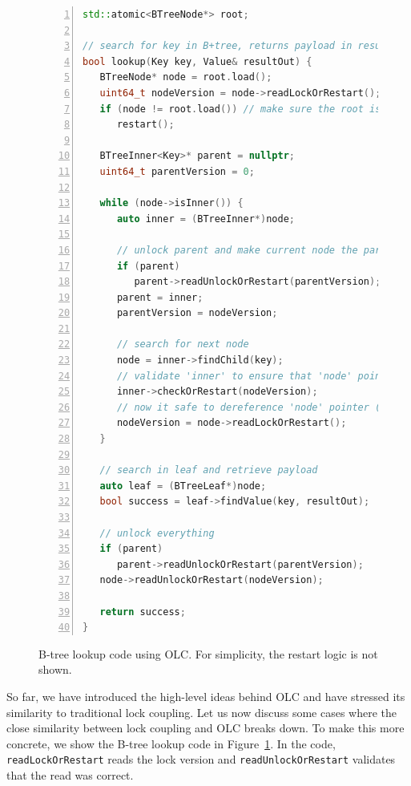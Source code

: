 \documentclass[11pt]{article}
\begin{document}
\begin{figure}
\begin{lstlisting}[basicstyle=\ttfamily,language=C++,numbers=left,numberstyle=\small]
std::atomic<BTreeNode*> root;

// search for key in B+tree, returns payload in resultOut
bool lookup(Key key, Value& resultOut) {
   BTreeNode* node = root.load();
   uint64_t nodeVersion = node->readLockOrRestart();
   if (node != root.load()) // make sure the root is still the root
      restart();

   BTreeInner<Key>* parent = nullptr;
   uint64_t parentVersion = 0;

   while (node->isInner()) {
      auto inner = (BTreeInner*)node;

      // unlock parent and make current node the parent
      if (parent)
         parent->readUnlockOrRestart(parentVersion);
      parent = inner;
      parentVersion = nodeVersion;

      // search for next node
      node = inner->findChild(key);
      // validate 'inner' to ensure that 'node' pointer is valid
      inner->checkOrRestart(nodeVersion);
      // now it safe to dereference 'node' pointer (read its version)
      nodeVersion = node->readLockOrRestart();
   }

   // search in leaf and retrieve payload
   auto leaf = (BTreeLeaf*)node;
   bool success = leaf->findValue(key, resultOut);

   // unlock everything
   if (parent)
      parent->readUnlockOrRestart(parentVersion);
   node->readUnlockOrRestart(nodeVersion);

   return success;
}
\end{lstlisting}
  \vspace{0.2cm}
  \caption{B-tree lookup code using OLC. For simplicity, the restart logic is not shown.}
  \label{fig:lookup}
\end{figure}

So far, we have introduced the high-level ideas behind OLC and have stressed its similarity to traditional lock coupling.
Let us now discuss some cases where the close similarity between lock coupling and OLC breaks down.
To make this more concrete, we show the B-tree lookup code in Figure~\ref{fig:lookup}.
In the code, \texttt{readLockOrRestart} reads the lock version and \texttt{readUnlockOrRestart} validates that the read was correct.
\end{document}

